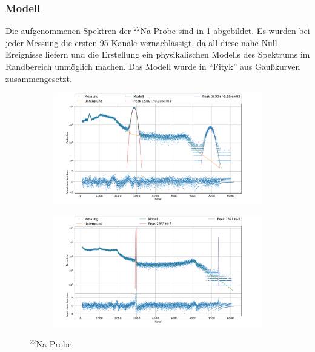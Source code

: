 \documentclass[
	a4paper,
	12pt,
	pagesize,
	ngerman
]{scrartcl}
\begin{document}
	\subsubsection{Modell}
	Die aufgenommenen Spektren der $^{22}$Na-Probe sind in \cref{fg_Na_ch} abgebildet.
	Es wurden bei jeder Messung die ersten 95 Kanäle vernachlässigt, da all diese nahe Null Ereignisse liefern und die Erstellung ein physikalischen Modells des Spektrums im Randbereich unmöglich machen. %
	Das Modell wurde in \enquote{Fityk} aus Gaußkurven zusammengesetzt.
	\begin{figure}[H]
		\centering
		\begin{subfigure}[c]{\textwidth}
			\centering
			\includegraphics[width= 1 \linewidth]{img/NaNaCh.pdf}
		\end{subfigure}
		\begin{subfigure}[c]{\textwidth}
			\centering
			\includegraphics[width= 1 \linewidth]{img/NaGeCh.pdf}
		\end{subfigure}
		\caption{$^{22}$Na-Probe}
		\label{fg_Na_ch}
	\end{figure}
\end{document}
